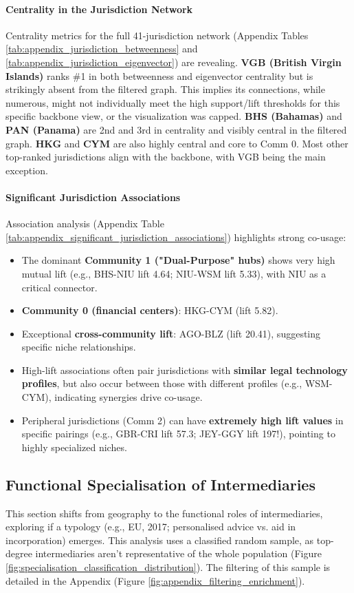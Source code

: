 \paragraph{Centrality in the Jurisdiction Network}
Centrality metrics for the full 41-jurisdiction network (Appendix Tables \ref{tab:appendix_jurisdiction_betweenness} and \ref{tab:appendix_jurisdiction_eigenvector}) are revealing.
\textbf{VGB (British Virgin Islands)} ranks \#1 in both betweenness and eigenvector centrality but is strikingly absent from the filtered graph. This implies its connections, while numerous, might not individually meet the high support/lift thresholds for this specific backbone view, or the visualization was capped.
\textbf{BHS (Bahamas)} and \textbf{PAN (Panama)} are 2nd and 3rd in centrality and visibly central in the filtered graph. \textbf{HKG} and \textbf{CYM} are also highly central and core to Comm 0. Most other top-ranked jurisdictions align with the backbone, with VGB being the main exception.

\paragraph{Significant Jurisdiction Associations}
Association analysis (Appendix Table \ref{tab:appendix_significant_jurisdiction_associations}) highlights strong co-usage:
\begin{itemize}
    \item The dominant \textbf{Community 1 ("Dual-Purpose" hubs)} shows very high mutual lift (e.g., BHS-NIU lift 4.64; NIU-WSM lift 5.33), with NIU as a critical connector.
    \item \textbf{Community 0 (financial centers)}: HKG-CYM (lift 5.82).
    \item Exceptional \textbf{cross-community lift}: AGO-BLZ (lift 20.41), suggesting specific niche relationships.
    \item High-lift associations often pair jurisdictions with \textbf{similar legal technology profiles}, but also occur between those with different profiles (e.g., WSM-CYM), indicating synergies drive co-usage.
    \item Peripheral jurisdictions (Comm 2) can have \textbf{extremely high lift values} in specific pairings (e.g., GBR-CRI lift 57.3; JEY-GGY lift 197!), pointing to highly specialized niches.
\end{itemize}

\subsection{Functional Specialisation of Intermediaries}
This section shifts from geography to the functional roles of intermediaries, exploring if a typology (e.g., EU, 2017; personalised advice vs. aid in incorporation) emerges. This analysis uses a classified random sample, as top-degree intermediaries aren't representative of the whole population (Figure \ref{fig:specialisation_classification_distribution}). The filtering of this sample is detailed in the Appendix (Figure \ref{fig:appendix_filtering_enrichment}).

